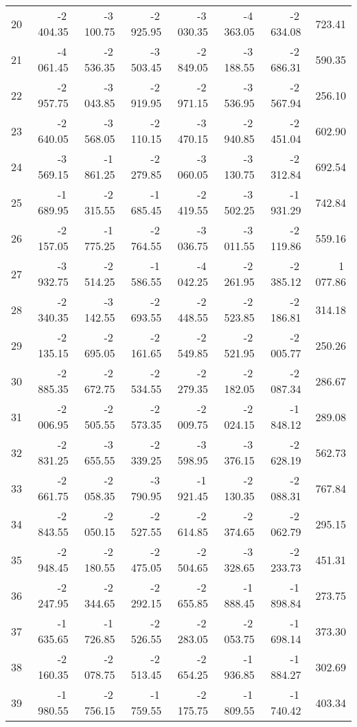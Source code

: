 \begin{longtable}{rrrrrrrr}
20 & -2\,404.35 & -3\,100.75 & -2\,925.95 & -3\,030.35 & -4\,363.05 & -2\,634.08 & 723.41  \\
21 & -4\,061.45 & -2\,536.35 & -3\,503.45 & -2\,849.05 & -3\,188.55 & -2\,686.31 & 590.35  \\
22 & -2\,957.75 & -3\,043.85 & -2\,919.95 & -2\,971.15 & -3\,536.95 & -2\,567.94 & 256.10  \\
23 & -2\,640.05 & -3\,568.05 & -2\,110.15 & -3\,470.15 & -2\,940.85 & -2\,451.04 & 602.90  \\
24 & -3\,569.15 & -1\,861.25 & -2\,279.85 & -3\,060.05 & -3\,130.75 & -2\,312.84 & 692.54  \\
25 & -1\,689.95 & -2\,315.55 & -1\,685.45 & -2\,419.55 & -3\,502.25 & -1\,931.29 & 742.84  \\
26 & -2\,157.05 & -1\,775.25 & -2\,764.55 & -3\,036.75 & -3\,011.55 & -2\,119.86 & 559.16  \\
27 & -3\,932.75 & -2\,514.25 & -1\,586.55 & -4\,042.25 & -2\,261.95 & -2\,385.12 & 1\,077.86  \\
28 & -2\,340.35 & -3\,142.55 & -2\,693.55 & -2\,448.55 & -2\,523.85 & -2\,186.81 & 314.18  \\
29 & -2\,135.15 & -2\,695.05 & -2\,161.65 & -2\,549.85 & -2\,521.95 & -2\,005.77 & 250.26  \\
30 & -2\,885.35 & -2\,672.75 & -2\,534.55 & -2\,279.35 & -2\,182.05 & -2\,087.34 & 286.67  \\
31 & -2\,006.95 & -2\,505.55 & -2\,573.35 & -2\,009.75 & -2\,024.15 & -1\,848.12 & 289.08  \\
32 & -2\,831.25 & -3\,655.55 & -2\,339.25 & -3\,598.95 & -3\,376.15 & -2\,628.19 & 562.73  \\
33 & -2\,661.75 & -2\,058.35 & -3\,790.95 & -1\,921.45 & -2\,130.35 & -2\,088.31 & 767.84  \\
34 & -2\,843.55 & -2\,050.15 & -2\,527.55 & -2\,614.85 & -2\,374.65 & -2\,062.79 & 295.15  \\
35 & -2\,948.45 & -2\,180.55 & -2\,475.05 & -2\,504.65 & -3\,328.65 & -2\,233.73 & 451.31  \\
36 & -2\,247.95 & -2\,344.65 & -2\,292.15 & -2\,655.85 & -1\,888.45 & -1\,898.84 & 273.75  \\
37 & -1\,635.65 & -1\,726.85 & -2\,526.55 & -2\,283.05 & -2\,053.75 & -1\,698.14 & 373.30  \\
38 & -2\,160.35 & -2\,078.75 & -2\,513.45 & -2\,654.25 & -1\,936.85 & -1\,884.27 & 302.69  \\
39 & -1\,980.55 & -2\,756.15 & -1\,759.55 & -2\,175.75 & -1\,809.55 & -1\,740.42 & 403.34  \\

\end{longtable}
